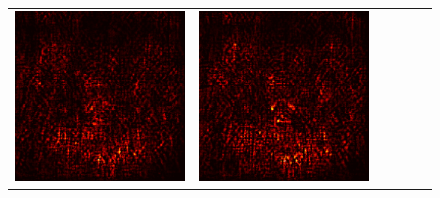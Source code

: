 \documentclass[preprint,12pt]{elsarticle}
\begin{document}
\begin{figure}[p]
\begin{tabular}{cccccc}
  \includegraphics[scale=\scale]{../visualizations/examples/imagenette/resnet18/positive_saliency_map/6.png} & 
  \includegraphics[scale=\scale]{../visualizations/examples/imagenette/resnet18/negative_saliency_map/6.png} & 

\end{tabular}
\end{figure}
\end{document}
